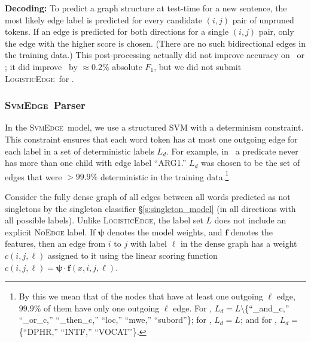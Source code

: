 \documentclass[11pt]{article}
\newcommand{\bocomment}[1]{\textcolor{Bittersweet}{[#1 -BTO]}}
\renewcommand{\bocomment}[1]{}
\newcommand{\codenote}[1]{}
\newcommand{\logitedge}{\textsc{LogisticEdge}}
\newcommand{\svmedge}{\textsc{SvmEdge}}
\begin{document}



\noindent
\textbf{Decoding:} \codenote{MyGraph::decodeEdgeProbsToGraph()}
To predict a graph structure at test-time for a new sentence,
the most likely edge label is predicted for every candidate $(i, j)$ pair of
unpruned tokens.
If an edge is predicted for both directions for a single $(i,j)$
pair, only the edge with the higher score is chosen.
(There are no such bidirectional edges in the training data.)
This post-processing actually did not improve accuracy on \DM\ or \PCEDT;
it did improve \PAS\ by $\approx$0.2\% absolute $F_1$, but we did not submit \logitedge\ for \PAS.
\codenote{\url{https://github.com/Noahs-ARK/semeval-2014/pull/21}}


\subsubsection{\svmedge~Parser}
\label{s:graphparser}



In the \svmedge~model, we use a structured SVM
with a determinism constraint.
This constraint ensures that each word token has at most one outgoing edge for
each label in a set of deterministic labels $L_d$.
For example, in \DM\ a predicate never has more than one child with edge
label ``ARG1.''
 $L_d$ was chosen to be the set of edges that were $> 99.9\%$
deterministic in the training data.\footnote{
By this we mean that of the nodes that have at least one
outgoing $\ell$ edge, $99.9\%$ of them have only one outgoing $\ell$ edge.
For \DM, $L_d=L \setminus$\{``\_and\_c,'' ``\_or\_c,'' ``\_then\_c,''
``loc,'' ``mwe,'' ``subord''\};
for \PAS, $L_d = L$;
and for \PCEDT, $L_d=$\{``DPHR,'' ``INTF,''  ``VOCAT''\}.}

Consider the fully dense graph of all edges between all words predicted
as not singletons by the singleton classifier \S\ref{s:singleton_model} (in all
directions with all possible labels). Unlike \logitedge, the label set $L$ does
not include an explicit \textsc{NoEdge} label.
If $\bm\psi$ denotes the model
weights, and $\bm{f}$ denotes the features, then an edge from $i$ to $j$ with
label $\ell$ in the dense graph has a weight $c(i,j,\ell)$ assigned to it using the linear
scoring function $c(i,j,\ell) = \bm\psi \cdot \bm{f}(x,i,j,\ell)$.
\end{document}
